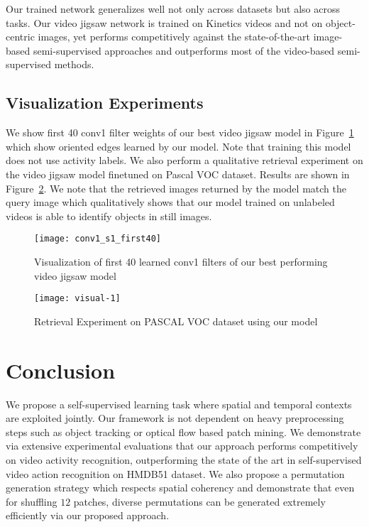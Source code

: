 \documentclass[10pt,twocolumn,letterpaper]{article}
\begin{document}
Our trained network generalizes well not only across datasets but also across tasks. Our video jigsaw network is trained on Kinetics videos and not on object-centric images, yet performs competitively against the state-of-the-art image-based semi-supervised approaches and outperforms most of the video-based semi-supervised methods. 

\subsection{Visualization Experiments}
We show first 40 conv1 filter weights of our best video jigsaw model in Figure~\ref{fig111} which show oriented edges learned by our model. Note that training this model does not use activity labels. We also perform a qualitative retrieval experiment on the video jigsaw model finetuned on Pascal VOC dataset. Results are shown in Figure~\ref{fig112}. We note that the retrieved images returned by the model match the query image which qualitatively shows that our model trained on unlabeled videos is able to identify objects in still images. 

\begin{figure}[t]
\centering
\texttt{[image: conv1\_s1\_first40]}
\caption{Visualization of first 40 learned conv1 filters of our best performing video jigsaw model}
\label{fig111}
\end{figure}

\begin{figure}[h!]
\centering
\texttt{[image: visual-1]}
\caption{Retrieval Experiment on PASCAL VOC dataset using our model}
\label{fig112}
\end{figure}



\section{Conclusion}
We propose a self-supervised learning task where spatial and temporal contexts are exploited jointly. Our framework is not dependent on heavy preprocessing steps such as object tracking or optical flow based patch mining. We demonstrate via extensive experimental evaluations that our approach performs competitively on video activity recognition, outperforming the state of the art in self-supervised video action recognition on HMDB51 dataset. We also propose a permutation generation strategy which respects spatial coherency and demonstrate that even for shuffling $12$ patches, diverse permutations can be generated extremely efficiently via our proposed approach. 

{\small


}
\end{document}
